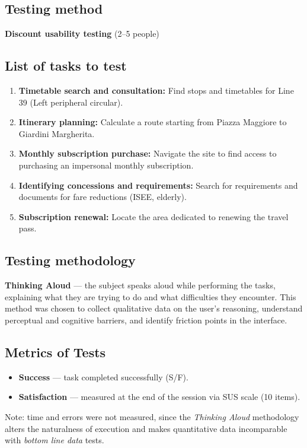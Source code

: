 ﻿\documentclass[11pt,a4paper]{article}
\begin{document}
\vspace{0.2cm}

\subsection*{Testing method}
\textbf{Discount usability testing} (2--5 people)

\vspace{0.2cm}

\subsection*{List of tasks to test}
\begin{tcolorbox}[base]
\begin{enumerate}[leftmargin=*,itemsep=4pt]
  \item \textbf{Timetable search and consultation:} Find stops and
  timetables for Line 39 (Left peripheral circular).
  \item \textbf{Itinerary planning:} Calculate a
  route starting from Piazza Maggiore to Giardini
  Margherita.
  \item \textbf{Monthly subscription purchase:} Navigate the site
  to find access to purchasing an impersonal monthly
  subscription.
  \item \textbf{Identifying concessions and requirements:}
  Search for requirements and documents for fare reductions
  (ISEE, elderly).
  \item \textbf{Subscription renewal:} Locate the area
  dedicated to renewing the travel pass.
\end{enumerate}
\end{tcolorbox}

\vspace{0.2cm}

\subsection*{Testing methodology}
\textbf{Thinking Aloud} --- the subject speaks aloud
while performing the tasks, explaining what they are trying
to do and what difficulties they encounter. This method was
chosen to collect qualitative data on the user's reasoning,
understand perceptual and cognitive barriers,
and identify friction points in the interface.

\vspace{0.2cm}

\subsection*{Metrics of Tests}
\begin{itemize}[leftmargin=*,itemsep=3pt]
  \item \textbf{Success} --- task completed successfully (S/F).
  \item \textbf{Satisfaction} --- measured at the end of the session
  via SUS scale (10 items).
\end{itemize}
\small Note: time and errors were not measured, since
the \textit{Thinking Aloud} methodology alters the naturalness
of execution and makes quantitative data incomparable
with \textit{bottom line data} tests.
\end{document}
